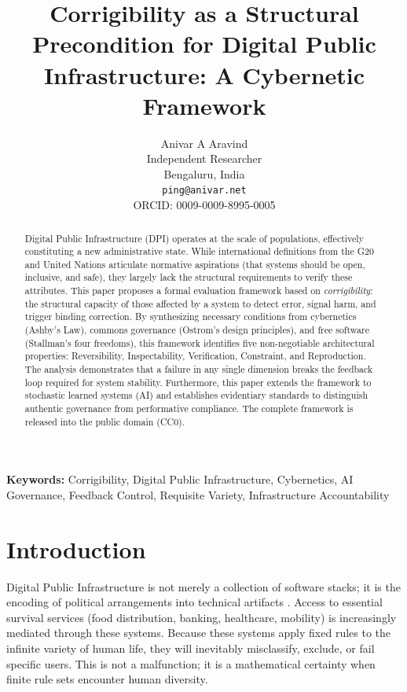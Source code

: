 \documentclass{article}
\title{Corrigibility as a Structural Precondition for Digital Public Infrastructure: A Cybernetic Framework}
\author{
  Anivar A Aravind \\
  Independent Researcher\\
  Bengaluru, India \\
  \texttt{ping@anivar.net} \\
  ORCID: 0009-0009-8995-0005
}
\newenvironment{keywords}{\noindent\textbf{Keywords:} }{\par\medskip}
\begin{document}
\maketitle

\begin{abstract}
Digital Public Infrastructure (DPI) operates at the scale of populations, effectively constituting a new administrative state. While international definitions from the G20 and United Nations articulate normative aspirations (that systems should be open, inclusive, and safe), they largely lack the structural requirements to verify these attributes. This paper proposes a formal evaluation framework based on \textit{corrigibility}: the structural capacity of those affected by a system to detect error, signal harm, and trigger binding correction. By synthesizing necessary conditions from cybernetics (Ashby's Law), commons governance (Ostrom's design principles), and free software (Stallman's four freedoms), this framework identifies five non-negotiable architectural properties: Reversibility, Inspectability, Verification, Constraint, and Reproduction. The analysis demonstrates that a failure in any single dimension breaks the feedback loop required for system stability. Furthermore, this paper extends the framework to stochastic learned systems (AI) and establishes evidentiary standards to distinguish authentic governance from performative compliance. The complete framework is released into the public domain (CC0).
\end{abstract}

\begin{keywords}
Corrigibility, Digital Public Infrastructure, Cybernetics, AI Governance, Feedback Control, Requisite Variety, Infrastructure Accountability
\end{keywords}

\section{Introduction}

Digital Public Infrastructure is not merely a collection of software stacks; it is the encoding of political arrangements into technical artifacts \citep{winner1980}. Access to essential survival services (food distribution, banking, healthcare, mobility) is increasingly mediated through these systems. Because these systems apply fixed rules to the infinite variety of human life, they will inevitably misclassify, exclude, or fail specific users. This is not a malfunction; it is a mathematical certainty when finite rule sets encounter human diversity.
\end{document}
